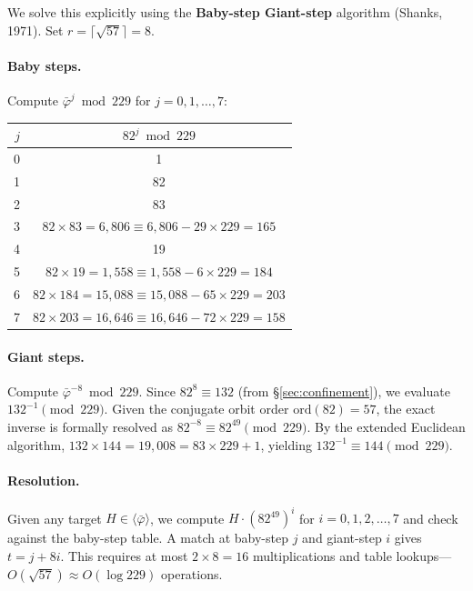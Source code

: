 \documentclass[12pt,oneside]{article}
\theoremstyle{principia}
\theoremstyle{definition}
\theoremstyle{remark}
\begin{document}
We solve this explicitly using the \textbf{Baby-step Giant-step}
algorithm (Shanks, 1971). Set $r = \lceil\sqrt{57}\rceil = 8$.

\paragraph{Baby steps.} Compute $\bar\varphi^j \bmod 229$ for
$j = 0, 1, \ldots, 7$:

\begin{center}
\begin{tabular}{@{}rc@{}}
\toprule
$j$ & $82^j \bmod 229$ \\
\midrule
0 & 1 \\
1 & 82 \\
2 & 83 \\
3 & $82 \times 83 = 6{,}806 \equiv 6{,}806 - 29 \times 229 = 165$ \\
4 & 19 \\
5 & $82 \times 19 = 1{,}558 \equiv 1{,}558 - 6 \times 229 = 184$ \\
6 & $82 \times 184 = 15{,}088 \equiv 15{,}088 - 65 \times 229 = 203$ \\
7 & $82 \times 203 = 16{,}646 \equiv 16{,}646 - 72 \times 229 = 158$ \\
\bottomrule
\end{tabular}
\end{center}

\paragraph{Giant steps.} Compute $\bar\varphi^{-8} \bmod 229$.
Since $82^8 \equiv 132$ (from \S\ref{sec:confinement}), we evaluate
$132^{-1} \pmod{229}$. Given the conjugate orbit order $\mathrm{ord}(82) = 57$,
the exact inverse is formally resolved as $82^{-8} \equiv 82^{49} \pmod{229}$.
By the extended Euclidean algorithm, $132 \times 144 = 19{,}008 = 83 \times 229 + 1$,
yielding $132^{-1} \equiv 144 \pmod{229}$.

\paragraph{Resolution.}
Given any target $H \in \langle\bar\varphi\rangle$, we compute
$H \cdot (82^{49})^i$ for $i = 0, 1, 2, \ldots, 7$ and check
against the baby-step table. A match at baby-step $j$ and
giant-step $i$ gives $t = j + 8i$. This requires at most
$2 \times 8 = 16$ multiplications and table lookups---$O(\sqrt{57})
\approx O(\log 229)$ operations.
\end{document}
